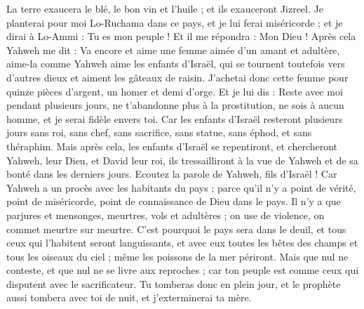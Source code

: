 \begin{multicols}{2}
La terre exaucera le blé, le bon vin et l'huile ; et ils exauceront Jizreel.
Je planterai pour moi Lo-Ruchama dans ce pays, et je lui ferai miséricorde ; et je dirai à Lo-Ammi : Tu es mon peuple ! Et il me répondra : Mon Dieu !
\VerseOne{}Après cela Yahweh me dit : Va encore et aime une femme aimée d'un amant et adultère, aime-la comme Yahweh aime les enfants d'Israël, qui se tournent toutefois vers d'autres dieux et aiment les gâteaux de raisin.
J’achetai donc cette femme pour quinze pièces d'argent, un homer et demi d'orge.
Et je lui dis : Reste avec moi pendant plusieurs jours, ne t'abandonne plus à la prostitution, ne sois à aucun homme, et je serai fidèle envers toi.
Car les enfants d'Israël resteront plusieurs jours sans roi, sans chef, sans sacrifice, sans statue, sans éphod, et sans théraphim.
Mais après cela, les enfants d'Israël se repentiront, et chercheront Yahweh, leur Dieu, et David leur roi, ils tressailliront à la vue de Yahweh et de sa bonté dans les derniers jours.
\VerseOne{}Ecoutez la parole de Yahweh, fils d'Israël ! Car Yahweh a un procès avec les habitants du pays ; parce qu'il n'y a point de vérité, point de miséricorde, point de connaissance de Dieu dans le pays.
Il n'y a que parjures et mensonges, meurtres, vols et adultères ; on use de violence, on commet meurtre sur meurtre.
C'est pourquoi le pays sera dans le deuil, et tous ceux qui l’habitent seront languissants, et avec eux toutes les bêtes des champs et tous les oiseaux du ciel ; même les poissons de la mer périront.
Mais que nul ne conteste, et que nul ne se livre aux reproches ; car ton peuple est comme ceux qui disputent avec le sacrificateur.
Tu tomberas donc en plein jour, et le prophète aussi tombera avec toi de nuit, et j'exterminerai ta mère.

\end{multicols}
